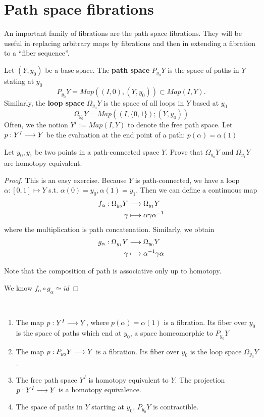 \documentclass[11pt]{book} %
\begin{document}
\section{Path space fibrations}
 An important family of fibrations are the path space fibrations. They will be useful in replacing arbitrary maps by fibrations and then in extending a fibration to a ``fiber sequence''.
 \begin{definition}
Let $(Y,y_0)$ be a base space. The \textbf{path space} $P_{y_0}Y$ is the space of paths in $Y$ stating at $y_0$
$$
P_{y_0}Y=Map((I,0), (Y,y_0))\subset Map(I,Y).
$$
Similarly, the \textbf{loop space} $\Omega_{y_0}Y$ is the space of all loops in $Y$ based at $y_0$
$$
\Omega_{y_0}Y=Map((I,\{0,1\}); (Y,y_0))
$$
Often, we the notion $Y^I:=Map(I,Y)$ to denote the free path space. Let $p: Y^{I}\longrightarrow Y$ be the evaluation at the end point of a path: $p(\alpha)=\alpha(1)$
 \end{definition}
 \begin{exr}
 Let $y_0,y_1$ be two points in a path-connected space $Y$. Prove that $\Omega_{y_0} Y$ and $\Omega_{y_1}Y$ are homotopy equivalent.
 \end{exr}
 \begin{proof}
This is an easy exercise. Because $Y$ is path-connected, we have a loop $\alpha: [0,1]\mapsto Y$ s.t. $\alpha(0)=y_0, \alpha(1)=y_1$. Then we can define a continuous map
$$
\begin{aligned}
f_\alpha: \Omega_{y_0}Y&\longrightarrow \Omega_{y_1}Y\\
 \gamma&\longmapsto \alpha \gamma \alpha^{-1} 
\end{aligned}
$$
where the multiplication is path concatenation.
Similarly, we obtain
$$
\begin{aligned}
g_\alpha: \Omega_{y_1}Y&\longrightarrow \Omega_{y_0}Y\\
 \gamma&\longmapsto \alpha^{-1} \gamma \alpha 
\end{aligned}
$$

Note that the composition of path is associative only up to homotopy.

We know $f_\alpha\circ g_\alpha\simeq id$
 \end{proof}
\begin{theorem}\ 
\begin{enumerate}
	\item The map $p: Y^I\longrightarrow Y$, where $p(\alpha)=\alpha(1)$ is a fibration. Its fiber over $y_0$ is the space of paths which end at $y_0$, a space homeomorphic to $P_{y_0}Y$
	\item The map $p: P_{y_0}Y\longrightarrow Y$ is a fibration. Its fiber over $y_0$ is the loop space $\Omega_{y_0}Y$.
	\item The free path space $Y^I$ is homotopy equivalent to $Y$. The projection $p:Y^I\longrightarrow Y$ is a homotopy equivalence.
	\item The space of paths in $Y$ starting at $y_0$, $P_{y_0}Y$ is contractible.
\end{enumerate}
\end{theorem}
\end{document}
